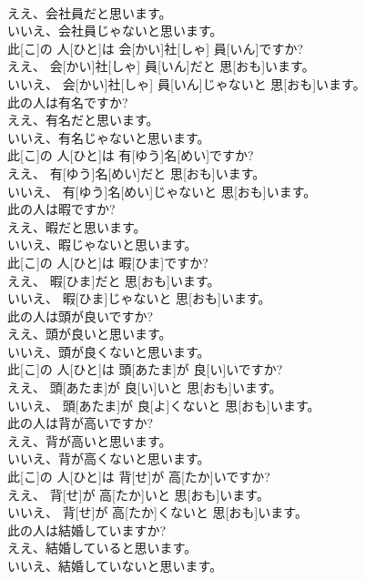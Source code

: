 \documentclass[8pt]{extreport}
\begin{document}
\begin{CJK}{UTF8}{min}
\\	ええ、会社員だと思います。 
\\	いいえ、会社員じゃないと思います。	
\\	此[こ]の 人[ひと]は 会[かい]社[しゃ] 員[いん]ですか? 
\\	ええ、 会[かい]社[しゃ] 員[いん]だと 思[おも]います。 
\\	いいえ、 会[かい]社[しゃ] 員[いん]じゃないと 思[おも]います。
\\	此の人は有名ですか? 
\\	ええ、有名だと思います。 
\\	いいえ、有名じゃないと思います。	
\\	此[こ]の 人[ひと]は 有[ゆう]名[めい]ですか? 
\\	ええ、 有[ゆう]名[めい]だと 思[おも]います。 
\\	いいえ、 有[ゆう]名[めい]じゃないと 思[おも]います。
\\	此の人は暇ですか? 
\\	ええ、暇だと思います。 
\\	いいえ、暇じゃないと思います。	
\\	此[こ]の 人[ひと]は 暇[ひま]ですか? 
\\	ええ、 暇[ひま]だと 思[おも]います。 
\\	いいえ、 暇[ひま]じゃないと 思[おも]います。
\\	此の人は頭が良いですか? 
\\	ええ、頭が良いと思います。 
\\	いいえ、頭が良くないと思います。	
\\	此[こ]の 人[ひと]は 頭[あたま]が 良[い]いですか? 
\\	ええ、 頭[あたま]が 良[い]いと 思[おも]います。 
\\	いいえ、 頭[あたま]が 良[よ]くないと 思[おも]います。
\\	此の人は背が高いですか? 
\\	ええ、背が高いと思います。 
\\	いいえ、背が高くないと思います。	
\\	此[こ]の 人[ひと]は 背[せ]が 高[たか]いですか? 
\\	ええ、 背[せ]が 高[たか]いと 思[おも]います。 
\\	いいえ、 背[せ]が 高[たか]くないと 思[おも]います。
\\	此の人は結婚していますか? 
\\	ええ、結婚していると思います。 
\\	いいえ、結婚していないと思います。	

\end{CJK}
\end{document}
